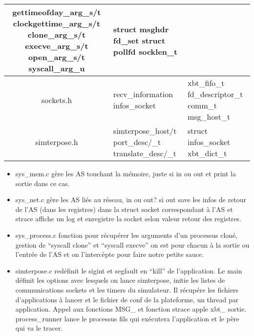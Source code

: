 \documentclass{article}
\begin{document}
\begin{tabularx}{15cm}{|c|X|X|}
{    gettimeofday\_arg\_s/t \newline clockgettime\_arg\_s/t \newline
    clone\_arg\_s/t \newline execve\_arg\_s/t \newline
    open\_arg\_s/t \newline syscall\_arg\_u} & {\color{brown} struct
    msghdr \newline fd\_set \newline struct pollfd \newline
    socklen\_t}\\ \hline sockets.h & {\color{purple}
    recv\_information \newline infos\_socket} & {\color{brown}
    xbt\_fifo\_t \newline fd\_descriptor\_t \newline comm\_t
    msg\_host\_t } \\ \hline simterpose.h & {\color{purple}
    simterpose\_host/t \newline port\_desc/\_t \newline
    translate\_desc/\_t} & {\color{brown} struct
    infos\_socket \newline xbt\_dict\_t} \\ \hline
\end{tabularx}

\begin{itemize}

\item sys\_mem.c gère les AS touchant la mémoire, juste si in ou out
  et print la sortie dans ce cas.
\item sys\_net.c gère les AS liés au réseau, in ou out? si out save
  les infos de retour de l'AS (dans les registres) dans la struct
  socket correspondant à l'AS et strace affiche un log et enregistre
  la socket selon valeur retour des registres.
\item sys\_process.c fonction pour récupérer les arguments d'un processus cloné, gestion de ``syscall clone'' et ``syscall execve'' on est pour chacun à la sortie ou l'entrée de l'AS et on l'intercèpte pour faire notre petite sauce.

\item simterpose.c redéfinit le sigint et segfault en ``kill'' de
  l'application. Le main définit les options avec lesquels on lance
  simterpose, initie les listes de communications sockets et les
  timers du simulateur. Il récupére les fichiers d'applications à
  lancer et le fichier de conf de la plateforme, {\color{red} un
    thread par application}. Appel aux fonctions MSG\_\* et fonction
  strace apple xbt\_\* sortie. process\_runner lance le processus fils
  qui exécutera l'application et le père qui va le tracer.
\end{itemize}
\vspace{0.5cm} 
\end{document}
